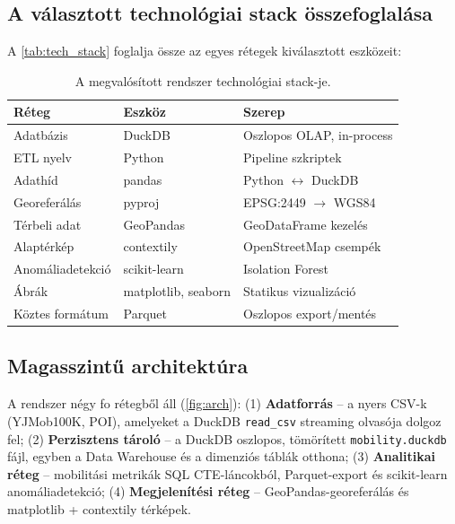 \subsection{A választott technológiai stack összefoglalása}

A \autoref{tab:tech_stack} foglalja össze az egyes rétegek kiválasztott eszközeit:

\begin{table}[H]
\centering
\caption{A megvalósított rendszer technológiai stack-je.}
\label{tab:tech_stack}
\begin{tabular}{l l l}
\hline
\textbf{Réteg} & \textbf{Eszköz} & \textbf{Szerep} \\
\hline
Adatbázis       & DuckDB            & Oszlopos OLAP, in-process \\
ETL nyelv       & Python            & Pipeline szkriptek \\
Adathíd         & pandas            & Python $\leftrightarrow$ DuckDB \\
Georeferálás    & pyproj            & EPSG:2449 $\rightarrow$ WGS84 \\
Térbeli adat    & GeoPandas         & GeoDataFrame kezelés \\
Alaptérkép      & contextily        & OpenStreetMap csempék \\
Anomáliadetekció & scikit-learn     & Isolation Forest \\
Ábrák           & matplotlib, seaborn & Statikus vizualizáció \\
Köztes formátum & Parquet           & Oszlopos export/mentés \\
\hline
\end{tabular}
\end{table}


\subsection{Magasszintű architektúra}

A rendszer négy fo rétegből áll (\autoref{fig:arch}): (1) \textbf{Adatforrás} -- a nyers CSV-k (YJMob100K, POI), amelyeket a DuckDB \texttt{read\_csv} streaming olvasója dolgoz fel; (2) \textbf{Perzisztens tároló} -- a DuckDB oszlopos, tömörített \texttt{mobility.duckdb} fájl, egyben a Data Warehouse és a dimenziós táblák otthona; (3) \textbf{Analitikai réteg} -- mobilitási metrikák SQL CTE-láncokból, Parquet-export és scikit-learn anomáliadetekció; (4) \textbf{Megjelenítési réteg} -- GeoPandas-georeferálás és matplotlib + contextily térképek.

